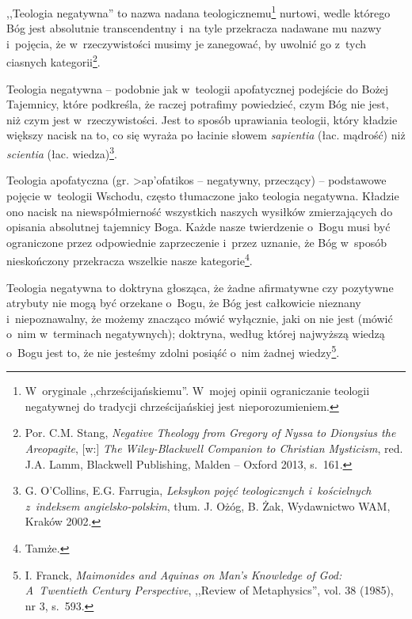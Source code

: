 \begin{defin}
,,Teologia negatywna'' to nazwa nadana teologicznemu\footnote{W~oryginale ,,chrześcijańskiemu''. W~mojej opinii ograniczanie teologii negatywnej do tradycji chrześcijańskiej jest nieporozumieniem.} nurtowi, wedle którego Bóg jest absolutnie transcendentny i~na tyle przekracza nadawane mu nazwy i~pojęcia, że w~rzeczywistości musimy je zanegować, by uwolnić go z~tych ciasnych kategorii\footnote{Por. C.M. Stang, \textit{Negative Theology from Gregory of Nyssa to Dionysius the Areopagite}, [w:] \textit{The Wiley-Blackwell Companion to Christian Mysticism}, red. J.A. Lamm, Blackwell Publishing, Malden -- Oxford 2013, s.~161.}.
\end{defin}
\begin{defin}
Teologia negatywna -- podobnie jak w~teologii apofatycznej podejście do Bożej Tajemnicy, które podkreśla, że raczej potrafimy powiedzieć, czym Bóg nie jest, niż czym jest w~rzeczywistości. Jest to sposób uprawiania teologii, który kładzie większy nacisk na to, co się wyraża po łacinie słowem \textit{sapientia} (łac. mądrość) niż \textit{scientia} (łac. wiedza)\footnote{G. O'Collins, E.G. Farrugia, \textit{Leksykon pojęć teologicznych i~kościelnych z~indeksem angielsko-polskim}, tłum. J. Ożóg, B. Żak, Wydawnictwo WAM, Kraków 2002.}.
\end{defin}
\begin{defin}
Teologia apofatyczna (gr. \textgreek{>ap'ofatikos} -- negatywny, przeczący) -- podstawowe pojęcie w~teologii Wschodu, często tłumaczone jako teologia negatywna. Kładzie ono nacisk na niewspółmierność wszystkich naszych wysiłków zmierzających do opisania absolutnej tajemnicy Boga. Każde nasze twierdzenie o~Bogu musi być ograniczone przez odpowiednie zaprzeczenie i~przez uznanie, że Bóg w~sposób nieskończony przekracza wszelkie nasze kategorie\footnote{Tamże.}.
\end{defin}
\begin{defin}\label{int-deftn-last}
Teologia negatywna to doktryna głosząca, że żadne afirmatywne czy pozytywne atrybuty nie mogą być orzekane o~Bogu, że Bóg jest całkowicie nieznany i~niepoznawalny, że możemy znacząco mówić wyłącznie, jaki on nie jest (mówić o~nim w~terminach negatywnych); doktryna, według której najwyższą wiedzą o~Bogu jest to, że nie jesteśmy zdolni posiąść o~nim żadnej wiedzy\footnote{I. Franck, \textit{Maimonides and Aquinas on Man's Knowledge of God: A~Twentieth Century Perspective}, ,,Review of Metaphysics'', vol. 38 (1985), nr 3, s.~593.}.
\end{defin}

